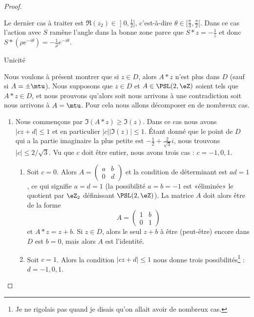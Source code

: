 \begin{proof}
\begin{subproof}
		Le dernier cas à traiter est \( \Re(z_2)\in\mathopen] 0 , \frac{ 1 }{2} \mathclose]\), c'est-à-dire \( \theta\in \mathopen[ \frac{ \pi }{ 3 } , \frac{ \pi }{2} [\). Dans ce cas l'action avec \( S\) ramène l'angle dans la bonne zone parce que \( S*z=-\frac{1}{ z }\) et donc \( S*(\rho e^{-i\theta})=-\frac{1}{ \rho } e^{-i\theta}\).

		\item[Unicité]

		Nous voulons à présent montrer que si \( z\in D\), alors \( A*z\) n'est plus dans \( D\) (sauf si \( A=\pm\mtu\)). Nous supposons que \( z\in D\) et \( A\in \PSL(2,\eZ)\) soient tels que \( A*z\in D\), et nous prouvons qu'alors soit nous arrivons à une contradiction soit nous arrivons à \( A=\mtu\). Pour cela nous allons décomposer en de nombreux cas.

		\begin{enumerate}
			\item
			      Nous commençons par \( \Im(A*z)\geq \Im(z)\). Dans ce cas nous avons \( | cz+d |\leq 1\) et en particulier \( | c | |\Im(z) |\leq 1\). Étant donné que le point de \( D\) qui a la partie imaginaire la plus petite est \( -\frac{ 1 }{2}+\frac{ 2 }{ \sqrt{3} }i\), nous trouvons \( | c |\leq 2/\sqrt{3}\). Vu que \( c\) doit être entier, nous avons trois cas : \( c=-1,0,1\).
			      \begin{enumerate}
				      \item
				            Soit \( c=0\). Alors \( A=\begin{pmatrix}
					            a & b \\
					            0 & d
				            \end{pmatrix}\) et la condition de déterminant est \( ad=1\), ce qui signifie \( a=d=1\) (la possibilité \( a=b=-1\) est «éliminée» le quotient par \( \eZ_2\) définissant \( \PSL(2,\eZ)\)). La matrice \( A\) doit alors être de la forme
				            \begin{equation}
					            A=\begin{pmatrix}
						            1 & b \\
						            0 & 1
					            \end{pmatrix}
				            \end{equation}
				            et \( A*z=z+b\). Si \( z\in D\), alors le seul \( z+b\) à être (peut-être) encore dans \( D\) est \( b=0\), mais alors \( A\) est l'identité.

				      \item
				            Soit \( c=1\). Alors la condition \( | cz+d |\leq 1\) nous donne trois possibilités\footnote{Je ne rigolais pas quand je disais qu'on allait avoir de nombreux cas.} : \( d=-1,0,1\).


\end{enumerate}
\end{enumerate}
\end{subproof}
\end{proof}
